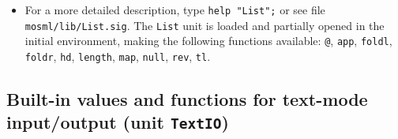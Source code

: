\documentclass[fleqn]{article}
\begin{document}
\begin{itemize}

\item For a more detailed description, type {\tt help "List";} or see
  file {\tt mosml/lib/List.sig}.  The {\tt List} unit is loaded and
  partially opened in the initial environment, making the following
  functions available: {\tt @}, {\tt app}, {\tt foldl}, {\tt foldr},
  {\tt hd}, {\tt length}, {\tt map}, {\tt null}, {\tt rev}, {\tt tl}.
\end{itemize}


\subsection*{Built-in values and functions for text-mode input/output (unit
  {\tt TextIO})}
\end{document}
